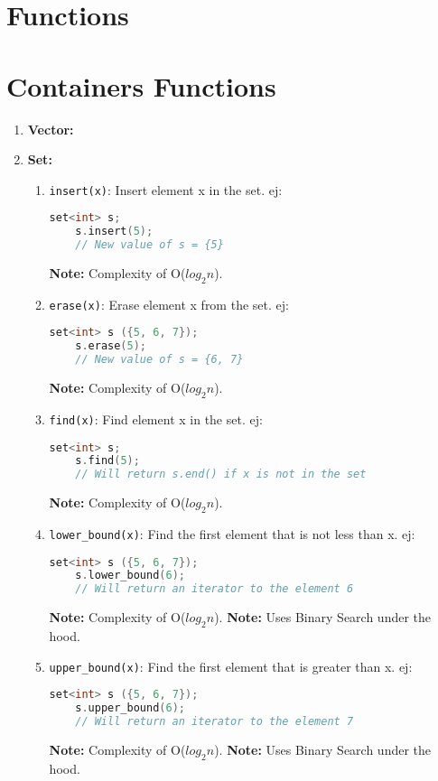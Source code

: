 \section{Functions}
\section*{Containers Functions}
\begin{enumerate}
  \item \textbf{Vector:}
  \item \textbf{Set:}
    \begin{enumerate}
      \item \texttt{insert(x)}: Insert element x in the set. ej: 
	\begin{lstlisting}[language=C++]
	set<int> s;
	s.insert(5);
	// New value of s = {5}
	\end{lstlisting}
	\textbf{Note:} Complexity of O($log_2n$).
      \item \texttt{erase(x)}: Erase element x from the set. ej: 
	\begin{lstlisting}[language=C++]
	set<int> s ({5, 6, 7});
	s.erase(5);
	// New value of s = {6, 7}
	\end{lstlisting}
	\textbf{Note:} Complexity of O($log_2n$).
      \item \texttt{find(x)}: Find element x in the set. ej: 
	\begin{lstlisting}[language=C++]
	set<int> s; 
	s.find(5);
	// Will return s.end() if x is not in the set
	\end{lstlisting}
	\textbf{Note:} Complexity of O($log_2n$).
      \item \texttt{lower\_bound(x)}: Find the first element that is not less than x. ej:
	\begin{lstlisting}[language=C++]
	set<int> s ({5, 6, 7});
	s.lower_bound(6);
	// Will return an iterator to the element 6
	\end{lstlisting}
	\textbf{Note:} Complexity of O($log_2n$).
	\textbf{Note:} Uses Binary Search under the hood.
      \item \texttt{upper\_bound(x)}: Find the first element that is greater than x. ej:
	\begin{lstlisting}[language=C++]
	set<int> s ({5, 6, 7});
	s.upper_bound(6);
	// Will return an iterator to the element 7
	\end{lstlisting}
	\textbf{Note:} Complexity of O($log_2n$).
	\textbf{Note:} Uses Binary Search under the hood.
    \end{enumerate}
\end{enumerate}
